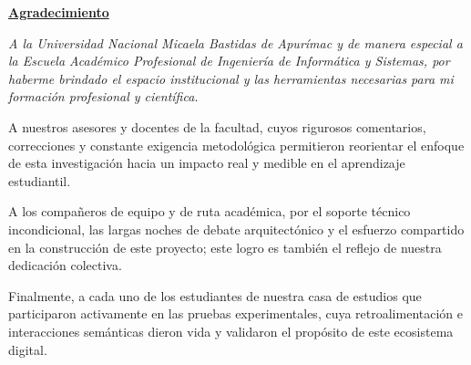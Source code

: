 \vfill

\begin{flushright}
\textbf{\underline{Agradecimiento}}
\end{flushright}

\vspace{0.5cm}

\begin{flushright}
\begin{minipage}{0.7\textwidth}
\itshape
\justify
A la Universidad Nacional Micaela Bastidas de Apurímac y de manera especial a la Escuela Académico Profesional de Ingeniería de Informática y Sistemas, por haberme brindado el espacio institucional y las herramientas necesarias para mi formación profesional y científica.

A nuestros asesores y docentes de la facultad, cuyos rigurosos comentarios, correcciones y constante exigencia metodológica permitieron reorientar el enfoque de esta investigación hacia un impacto real y medible en el aprendizaje estudiantil.

A los compañeros de equipo y de ruta académica, por el soporte técnico incondicional, las largas noches de debate arquitectónico y el esfuerzo compartido en la construcción de este proyecto; este logro es también el reflejo de nuestra dedicación colectiva.

Finalmente, a cada uno de los estudiantes de nuestra casa de estudios que participaron activamente en las pruebas experimentales, cuya retroalimentación e interacciones semánticas dieron vida y validaron el propósito de este ecosistema digital.
\end{minipage}
\end{flushright}
